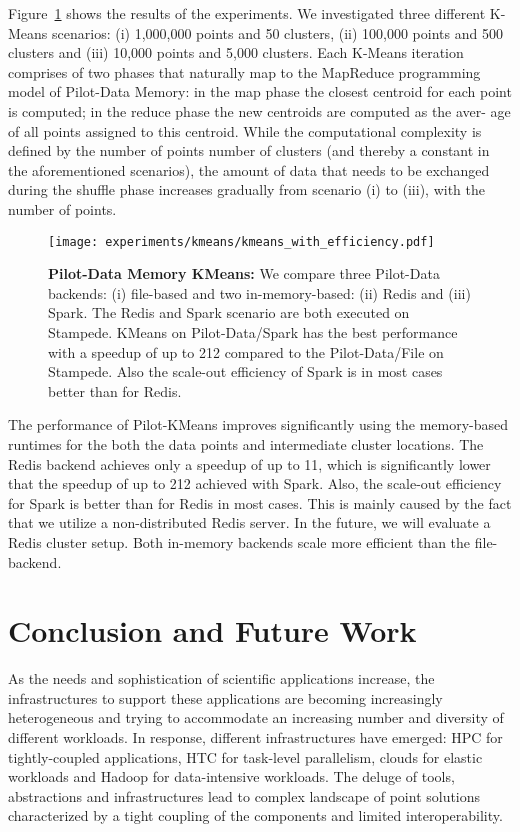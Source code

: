 \documentclass{sig-alternate}
\newcommand{\pilot}{Pilot\xspace}
\newcommand{\pilotdata}{Pilot-Data\xspace}
\newcommand{\pilotdatainmem}{Pilot-Data Memory\xspace}
\begin{document}
Figure~\ref{fig:experiments_kmeans_kmeans} shows the results of the
experiments. We investigated three different K-Means scenarios: (i)
1,000,000 points and 50 clusters, (ii) 100,000 points and 500
clusters and (iii) 10,000 points and 5,000 clusters. Each K-Means
iteration comprises of two phases that naturally map to the MapReduce
programming model of \pilotdatainmem: in the map phase the closest
centroid for each point is computed; in the reduce phase the new
centroids are computed as the aver- age of all points assigned to this
centroid. While the computational complexity is defined by the number
of points  number of clusters (and thereby a constant in the
aforementioned scenarios), the amount of data that needs to be
exchanged during the shuffle phase increases gradually from scenario
(i) to (iii), with the number of points.

\begin{figure}[t]
    \centering        \texttt{[image: experiments/kmeans/kmeans\_with\_efficiency.pdf]}
    \caption{\textbf{\pilotdatainmem KMeans:} We compare three Pilot-Data 
    backends: (i) file-based and two in-memory-based: (ii) Redis and (iii) 
    Spark. The Redis and Spark 
    scenario are both executed on Stampede. KMeans on \pilotdata/Spark has the 
    best performance with a speedup of up to 212 compared to the 
    \pilotdata/File on Stampede. Also the scale-out efficiency of Spark is in most cases better than for Redis.}
    \label{fig:experiments_kmeans_kmeans}
\end{figure}

The performance of \pilot-KMeans improves significantly using the memory-based
runtimes for the both the data points and intermediate cluster locations. The
Redis backend achieves only a speedup of up to 11, which is significantly lower
that the speedup of up to 212 achieved with Spark. Also, the scale-out
efficiency for Spark is better than for Redis in most cases. This is mainly
caused by the fact that we utilize a non-distributed Redis server. In the
future, we will evaluate a Redis cluster setup. Both in-memory backends
scale more efficient than the file-backend.






\section{Conclusion and Future Work}
\label{sec:conclusion}

As the needs and sophistication of scientific applications increase,
the infrastructures to support these applications are becoming
increasingly heterogeneous and trying to accommodate an increasing
number and diversity of different workloads. In response, different
infrastructures have emerged: HPC for tightly-coupled applications,
HTC for task-level parallelism, clouds for elastic workloads and
Hadoop for data-intensive workloads. The deluge of tools, abstractions and 
infrastructures lead to complex landscape of point solutions characterized by a
tight coupling of the components and limited interoperability.
\end{document}
